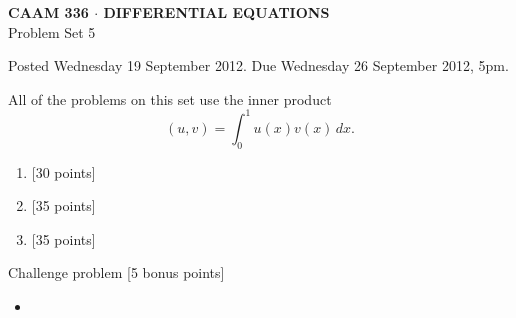 \documentclass[10pt]{article}
\begin{document}
\begin{center}
\large \textsf{\textbf{CAAM 336 $\cdot$ DIFFERENTIAL EQUATIONS}\\[0.5em]
 Problem Set 5 }
\end{center}

Posted Wednesday 19 September 2012.  Due Wednesday 26 September 2012, 5pm.
 

All of the problems on this set use the inner product
\[ (u,v) = \int_0^1 u(x) v(x)\,dx.\]
\begin{enumerate}
\item {[30 points]}\\  

\vspace*{1em}
\item {[35 points]}\\  


\item {[35 points]}\\  
\end{enumerate}

\vspace*{2em}
Challenge problem [5 bonus points]

\begin{itemize}
\item[]

\end{itemize}
\end{document}
